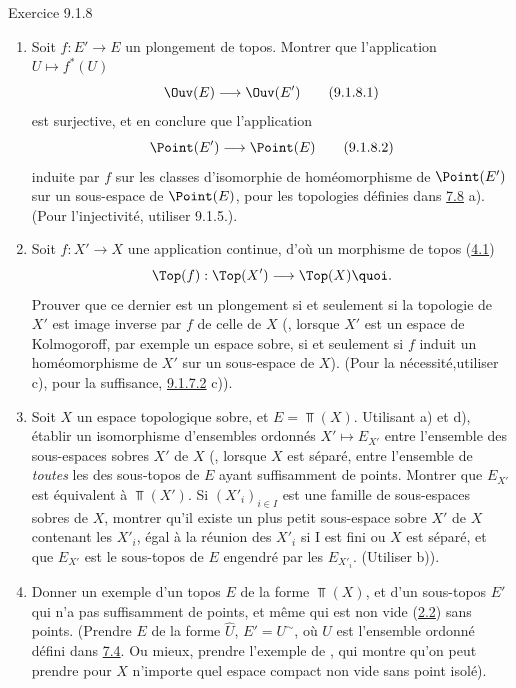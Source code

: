 \documentclass[10pt]{../fichiers-configuration-latex/smfart}
\begin{document}
\begin{enonce*}[remark]{Exercice 9.1.8}
\begin{enumerate}
\item Soit $f:E'\rightarrow E$ un plongement de topos. Montrer que
l'application $U\mapsto f^{\ast}(U)$
\begin{equation*}
\Ouv(E)\longrightarrow \Ouv(E')\tag{9.1.8.1}
\end{equation*}
est surjective, et en conclure que l'application
\begin{equation*}
\Point(E')\longrightarrow \Point(E)\tag{9.1.8.2}
\end{equation*}
induite par $f$ sur les classes d'isomorphie de 
homéomorphisme de $\Point(E')$ sur un sous-espace de $\Point(E)$,
pour les topologies définies dans \hyperref[IV.exer7.8]{7.8} a). (Pour
l'injectivité, utiliser 9.1.5.).

\item Soit $f:X'\rightarrow X$ une application continue, d'où un
morphisme de topos (\hyperref[IV.subsec4.1]{4.1})
$$
\Top(f):\Top(X')\longrightarrow \Top(X){\quoi}.
$$
Prouver que ce dernier est un plongement si et seulement si la
topologie de $X'$ est image inverse par $f$ de celle de $X$ (\ie,
lorsque $X'$ est un espace de Kolmogoroff, par exemple un espace
sobre, si et seulement si $f$ induit un homéomorphisme de $X'$ sur
un sous-espace de $X$). (Pour la nécessité,\pageoriginale utiliser
c), pour la suffisance, \hyperref[IV.exer9.1.7.2]{9.1.7.2} c)).

\item Soit $X$ un espace topologique sobre, et $E=\Top(X)$. Utilisant
a) et d), établir un isomorphisme d'ensembles ordonnés $X'\mapsto
E_{X'}$ entre l'ensemble des sous-espaces sobres $X'$ de $X$ (\ie,
lorsque $X$ est séparé, entre l'ensemble de \emph{toutes} les
 des sous-topos de $E$ ayant
suffisamment de points. Montrer que $E_{X'}$ est équivalent à
$\Top(X')$. Si $(X'_i)_{i\in I}$ est une famille de sous-espaces
sobres de $X$, montrer qu'il existe un plus petit sous-espace sobre
$X'$ de $X$ contenant les $X'_i$, égal à la réunion des $X'_i$ si I
est fini ou $X$ est séparé, et que $E_{X'}$ est le sous-topos de $E$
engendré par les $E_{X'_i}$. (Utiliser b)).

\item Donner un exemple d'un topos $E$ de la forme $\Top(X)$, et d'un
sous-topos $E'$ qui n'a pas suffisamment de points, et même qui est
non vide (\hyperref[IV.subsec2.2]{2.2}) sans points. (Prendre $E$ de la forme
$\widehat{U}$, $E'=U^{\sim}$, où $U$ est l'ensemble ordonné défini
dans \hyperref[IV.subsec7.4]{7.4}. Ou mieux, prendre l'exemple de ,
qui montre qu'on peut prendre pour $X$ n'importe quel espace compact
non vide sans point isolé).
\end{enumerate}
\end{enonce*}
\end{document}
